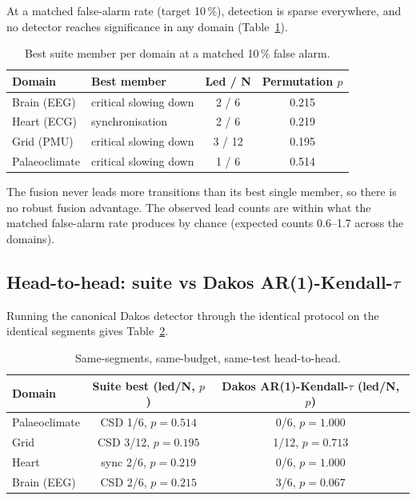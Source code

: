 \documentclass[11pt]{article}
\begin{document}
At a matched false-alarm rate (target 10\,\%), detection is sparse
everywhere, and no detector reaches significance in any domain
(Table~\ref{tab:fourdomain}).

\begin{table}[h!]
\centering
\begin{tabular}{llcc}
\toprule
Domain & Best member & Led / N & Permutation $p$ \\
\midrule
Brain (EEG) & critical slowing down & 2 / 6 & 0.215 \\
Heart (ECG) & synchronisation & 2 / 6 & 0.219 \\
Grid (PMU) & critical slowing down & 3 / 12 & 0.195 \\
Palaeoclimate & critical slowing down & 1 / 6 & 0.514 \\
\bottomrule
\end{tabular}
\caption{Best suite member per domain at a matched 10\,\% false alarm.}
\label{tab:fourdomain}
\end{table}

The fusion never leads more transitions than its best single member, so
there is no robust fusion advantage. The observed lead counts are
within what the matched false-alarm rate produces by chance (expected
counts 0.6--1.7 across the domains).

\subsection{Head-to-head: suite vs Dakos AR(1)-Kendall-$\tau$}\label{sec:headtohead}

Running the canonical Dakos detector through the identical protocol on
the identical segments gives Table~\ref{tab:headtohead}.

\begin{table}[h!]
\centering
\begin{tabular}{lcc}
\toprule
Domain & Suite best (led/N, $p$) & Dakos AR(1)-Kendall-$\tau$ (led/N, $p$) \\
\midrule
Palaeoclimate & CSD 1/6, $p = 0.514$ & 0/6, $p = 1.000$ \\
Grid & CSD 3/12, $p = 0.195$ & 1/12, $p = 0.713$ \\
Heart & sync 2/6, $p = 0.219$ & 0/6, $p = 1.000$ \\
Brain (EEG) & CSD 2/6, $p = 0.215$ & 3/6, $p = 0.067$ \\
\bottomrule
\end{tabular}
\caption{Same-segments, same-budget, same-test head-to-head.}
\label{tab:headtohead}
\end{table}
\end{document}
